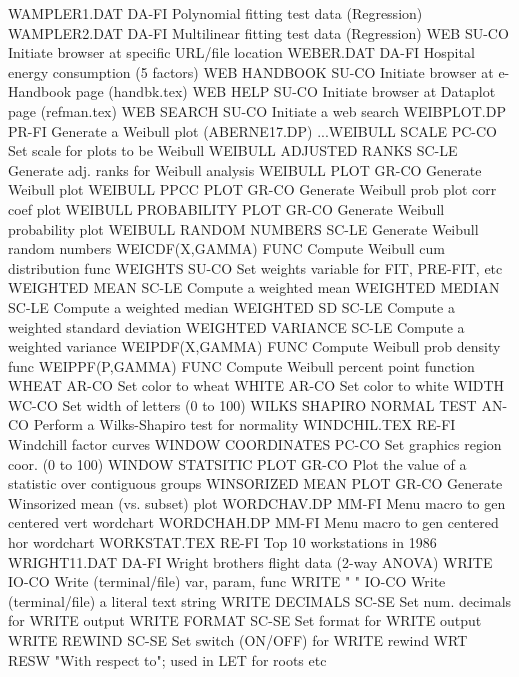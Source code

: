 WAMPLER1.DAT                DA-FI Polynomial fitting test data (Regression)
WAMPLER2.DAT                DA-FI Multilinear fitting test data (Regression)
WEB                         SU-CO Initiate browser at specific URL/file location
WEBER.DAT                   DA-FI Hospital energy consumption (5 factors)
WEB HANDBOOK                SU-CO Initiate browser at e-Handbook page (handbk.tex)
WEB HELP                    SU-CO Initiate browser at Dataplot page (refman.tex)
WEB SEARCH                  SU-CO Initiate a web search
WEIBPLOT.DP                 PR-FI Generate a Weibull plot (ABERNE17.DP)
...WEIBULL SCALE            PC-CO Set scale for plots to be Weibull
WEIBULL ADJUSTED RANKS      SC-LE Generate adj. ranks for Weibull analysis
WEIBULL PLOT                GR-CO Generate Weibull plot
WEIBULL PPCC PLOT           GR-CO Generate Weibull prob plot corr coef plot
WEIBULL PROBABILITY PLOT    GR-CO Generate Weibull probability plot
WEIBULL RANDOM NUMBERS      SC-LE Generate Weibull random numbers
WEICDF(X,GAMMA)             FUNC  Compute Weibull cum distribution func
WEIGHTS                     SU-CO Set weights variable for FIT, PRE-FIT, etc
WEIGHTED MEAN               SC-LE Compute a weighted mean
WEIGHTED MEDIAN             SC-LE Compute a weighted median
WEIGHTED SD                 SC-LE Compute a weighted standard deviation
WEIGHTED VARIANCE           SC-LE Compute a weighted variance
WEIPDF(X,GAMMA)             FUNC  Compute Weibull prob density func
WEIPPF(P,GAMMA)             FUNC  Compute Weibull percent point function
WHEAT                       AR-CO Set color to wheat
WHITE                       AR-CO Set color to white
WIDTH                       WC-CO Set width of letters (0 to 100)
WILKS SHAPIRO NORMAL TEST   AN-CO Perform a Wilks-Shapiro test for normality
WINDCHIL.TEX                RE-FI Windchill factor curves
WINDOW COORDINATES          PC-CO Set graphics region coor. (0 to 100)
WINDOW STATSITIC PLOT       GR-CO Plot the value of a statistic over contiguous groups
WINSORIZED MEAN PLOT        GR-CO Generate Winsorized mean (vs. subset) plot
WORDCHAV.DP                 MM-FI Menu macro to gen centered vert wordchart
WORDCHAH.DP                 MM-FI Menu macro to gen centered hor wordchart
WORKSTAT.TEX                RE-FI Top 10 workstations in 1986
WRIGHT11.DAT                DA-FI Wright brothers flight data (2-way ANOVA)
WRITE                       IO-CO Write (terminal/file) var, param, func
WRITE "  "                  IO-CO Write (terminal/file) a literal text string
WRITE DECIMALS              SC-SE Set num. decimals for WRITE output
WRITE FORMAT                SC-SE Set format for WRITE output
WRITE REWIND                SC-SE Set switch (ON/OFF) for WRITE rewind
WRT                         RESW  "With respect to"; used in LET for roots etc

